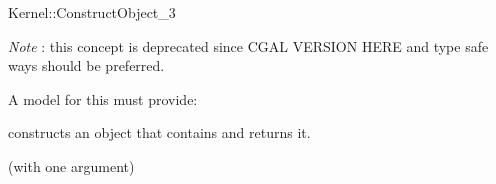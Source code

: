 \begin{ccRefFunctionObjectConcept}{Kernel::ConstructObject_3}
\begin{ccDeprecated}
{\em Note} : this concept is deprecated since CGAL VERSION HERE and type safe ways should be preferred. 

A model for this must provide:


{constructs an object that contains  and returns it.}

\ccRefines
{} (with one argument)

\ccSeeAlso
 \\
 \\
 \\
 \\
 \\
\end{ccDeprecated}
\end{ccRefFunctionObjectConcept}
